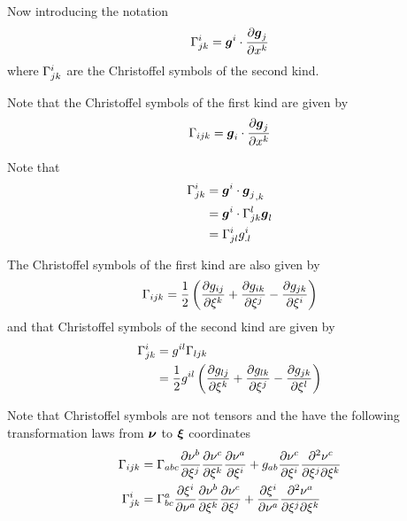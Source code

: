 Now introducing the notation
\begin{equation}
  \christoffelsecond{i}{j}{k} = \dotprod{\vect{g}^{i}}{\delby{\vect{g}_{j}}{x^{k}}}
\end{equation}
where $ \Gamma^{i}_{jk} $ are the Christoffel symbols of the second
kind. 

Note that the Christoffel symbols of the first kind are given by
\begin{equation}
  \christoffelfirst{i}{j}{k} = \dotprod{\vect{g}_{i}}{\delby{\vect{g}_{j}}{x^{k}}}
\end{equation}

Note that
\begin{equation}
  \begin{split}
    \christoffel{i}{j}{k} &= \dotprod{\vect{g}^{i}}{\partialderiv{\vect{g}_{j}}{k}} \\
    &=\dotprod{\vect{g}^{i}}{\christoffelsecond{l}{j}{k}\vect{g}_{l}} \\
    &= \christoffel{i}{j}{l}g^{i}_{.l} 
  \end{split}
\end{equation}

The Christoffel symbols of the first kind are also given by
\begin{equation}
   \Gamma_{ijk} =\frac{1}{2}\left(  \dfrac{\partial g_{ij}}{\partial \xi^{k}} + \dfrac{\partial g_{ik}}{\partial \xi^{j}} - \dfrac{\partial g_{jk}}{\partial \xi^{i}}  \right)
\end{equation}
and that Christoffel symbols of the second kind are given by
\begin{equation}
  \begin{split}
     \Gamma^{i}_{jk}  &= g^{il} \Gamma_{ljk}  \\
    &= \frac{1}{2}g^{il}\left(  \dfrac{\partial g_{lj}}{\partial \xi^{k}} + \dfrac{\partial g_{lk}}{\partial \xi^{j}} - \dfrac{\partial g_{jk}}{\partial \xi^{l}}  \right) 
  \end{split}
\end{equation}

Note that Christoffel symbols are not tensors and the have the following
transformation laws from $\vect{\nu}$ to $\vect{\xi}$ coordinates
\begin{align}
   \Gamma_{ijk}  &=
   \Gamma_{abc}  \dfrac{\partial \nu^{b}}{\partial \xi^{j}}  \dfrac{\partial \nu^{c}}{\partial \xi^{k}}  \dfrac{\partial \nu^{a}}{\partial \xi^{i}} +
  g_{ab} \dfrac{\partial \nu^{c}}{\partial \xi^{i}}  \dfrac{\partial^{2} \nu^{c}}{\partial \xi^{j} \partial \xi^{k}}  \\
   \Gamma^{i}_{jk}  &=  \Gamma^{a}_{bc}  \dfrac{\partial \xi^{i}}{\partial \nu^{a}}  \dfrac{\partial \nu^{b}}{\partial \xi^{k}}  \dfrac{\partial \nu^{c}}{\partial \xi^{j}} +
   \dfrac{\partial \xi^{i}}{\partial \nu^{a}}  \dfrac{\partial^{2} \nu^{a}}{\partial \xi^{j} \partial \xi^{k}}  \\
\end{align}

